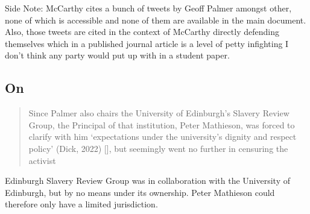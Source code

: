 Side Note: McCarthy cites a bunch of tweets by Geoff Palmer amongst other, none of which is accessible and none of them are available in the main document. Also, those tweets are cited in the context of McCarthy directly defending themselves which in a published journal article is a level of petty infighting I don't think any party would put up with in a student paper.

\subsection{On \cite{mccarthy_2022_2}}

\begin{quotation}
Since Palmer also chairs the University of Edinburgh’s Slavery Review Group, the Principal of that institution, Peter Mathieson, was forced to clarify with him ‘expectations under the university’s dignity and respect policy’ (Dick, 2022) [\cite{dick_2022}], but seemingly went no further in censuring the activist
\end{quotation}
\begin{flushright}
    \cite{mccarthy_2022_2}
\end{flushright}

Edinburgh Slavery Review Group was in collaboration with the University of Edinburgh, but by no means under its ownership. Peter Mathieson could therefore only have a limited jurisdiction.




